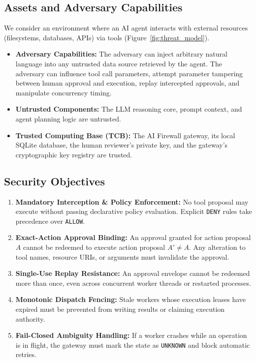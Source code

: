 \documentclass[sigconf,anonymous,review]{acmart}
\begin{document}
\subsection{Assets and Adversary Capabilities}
We consider an environment where an AI agent interacts with external resources (filesystems, databases, APIs) via tools (Figure~\ref{fig:threat_model}). 
\begin{itemize}
    \item \textbf{Adversary Capabilities:} The adversary can inject arbitrary natural language into any untrusted data source retrieved by the agent. The adversary can influence tool call parameters, attempt parameter tampering between human approval and execution, replay intercepted approvals, and manipulate concurrency timing.
    \item \textbf{Untrusted Components:} The LLM reasoning core, prompt context, and agent planning logic are untrusted.
    \item \textbf{Trusted Computing Base (TCB):} The AI Firewall gateway, its local SQLite database, the human reviewer's private key, and the gateway's cryptographic key registry are trusted.
\end{itemize}

\subsection{Security Objectives}
\begin{enumerate}
    \item \textbf{Mandatory Interception \& Policy Enforcement:} No tool proposal may execute without passing declarative policy evaluation. Explicit \texttt{DENY} rules take precedence over \texttt{ALLOW}.
    \item \textbf{Exact-Action Approval Binding:} An approval granted for action proposal $A$ cannot be redeemed to execute action proposal $A' \neq A$. Any alteration to tool names, resource URIs, or arguments must invalidate the approval.
    \item \textbf{Single-Use Replay Resistance:} An approval envelope cannot be redeemed more than once, even across concurrent worker threads or restarted processes.
    \item \textbf{Monotonic Dispatch Fencing:} Stale workers whose execution leases have expired must be prevented from writing results or claiming execution authority.
    \item \textbf{Fail-Closed Ambiguity Handling:} If a worker crashes while an operation is in flight, the gateway must mark the state as \texttt{UNKNOWN} and block automatic retries.
\end{enumerate}
\end{document}
